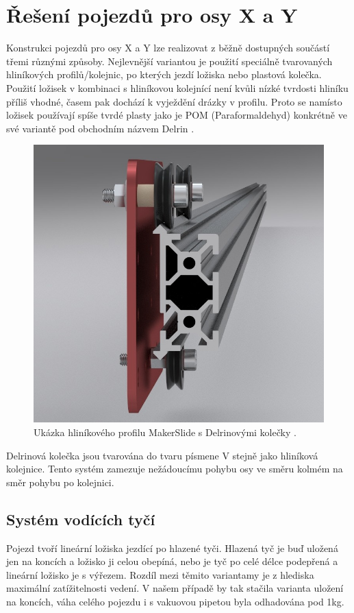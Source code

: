 \section{Řešení pojezdů pro osy X a Y}

Konstrukci pojezdů pro osy X a Y lze realizovat z běžně dostupných součástí třemi různými způsoby. Nejlevnější variantou je použití speciálně tvarovaných hliníkových profilů/kolejnic, po kterých jezdí ložiska nebo plastová kolečka. Použití ložisek v kombinaci s hliníkovou kolejnící není kvůli nízké tvrdosti hliníku příliš vhodné, časem pak dochází k vyježdění drázky v profilu. Proto se namísto ložisek používají spíše tvrdé plasty jako je POM (Paraformaldehyd) konkrétně ve své variantě pod obchodním názvem Delrin \cite{makerslide}. 

\begin{figure}[H]
  \centering
    \includegraphics[width=0.5\linewidth]{obrazky/makerslide.jpg}%
    \caption{Ukázka hliníkového profilu MakerSlide s Delrinovými kolečky \cite{makerslide}.}
    \label{fig:delrin}
\end{figure}


Delrinová kolečka jsou tvarována do tvaru písmene V stejně jako hliníková kolejnice. Tento systém zamezuje nežádoucímu pohybu osy ve směru kolmém na směr pohybu po kolejnici.

\subsection{Systém vodících tyčí}

Pojezd tvoří lineární ložiska jezdící po hlazené tyči. Hlazená tyč je buď uložená jen na koncích a ložisko ji celou obepíná, nebo je tyč po celé délce podepřená a lineární ložisko je s výřezem. Rozdíl mezi těmito variantamy je z hlediska maximální zatížitelnosti vedení. V našem případě by tak stačila varianta uložení  na koncích, váha celého pojezdu i s vakuovou pipetou byla odhadována pod 1kg.

